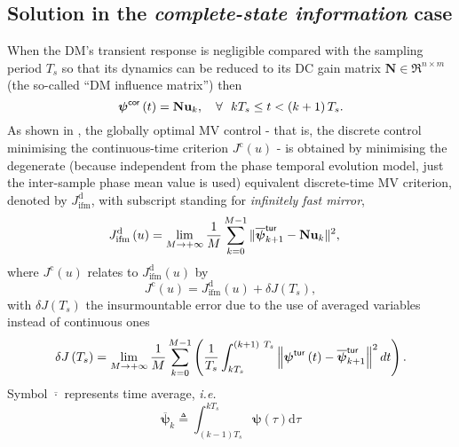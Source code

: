 \documentclass[a4paper,12pt]{article}
\newcommand{\0}{\mathsf{0}} %
\newcommand{\N}{\mathbf{N}} %
\newcommand{\tur}{\mathsf{\tiny{tur}}}
\newcommand{\dint}{\mathrm{d}} %
\newcommand{\cor}{\mathsf{\tiny{cor}}}
\newcommand{\phivec}{{\boldsymbol{\psi}}}
\newcommand{\uvec}{{\mathbf{u}}}
\begin{document}
        \subsection{Solution in the \emph{complete-state information} case}
        When the DM's transient response is negligible compared with the sampling
        period ${T_s}$ so that its dynamics can be reduced to its DC gain
        matrix $\N \in \Re^{n\times m}$
        (the so-called ``DM influence matrix'') then 
        \begin{equation}\label{eq:phicorr_from_u}
          \phivec ^{\cor}\left( t\right)
          =\N \uvec_{k},~ ~ ~  \forall~~ k{T_s}\leq t<\left( k+1\right)
          {T_s} .
        \end{equation}
        As shown in \cite{ kulcsar06},  the globally optimal MV
        control - that is, the discrete control 
        minimising the continuous-time criterion $J^\mathrm{c}(u)$ - is obtained by
        minimising the degenerate (because independent from the
        phase temporal evolution model, just the inter-sample phase
        mean value is used) equivalent discrete-time MV
        criterion\cite{leroux04, petit04}, denoted by
        $J_{\text{ifm}}^{\mathrm{d}}$, with subscript standing for \emph{infinitely
        fast mirror}, 
        \begin{align}
          J_\text{ifm}^{\mathrm{d}}\left(u\right)   &
          =\lim_{M\rightarrow+\infty}\frac{1}{M}\sum_{k=0}^{M-1}\Vert\overline{\phivec}_{k+1}^{\tur}
          - \N \uvec_k \Vert^2 ,
          \label{eq:Disc_criterion}
	\end{align}
        where $J^\mathrm{c}(u)$ relates to $J^\mathrm{d}_\text{ifm}(u)$ by
        \begin{equation}\label{eq:insurmontableerror}
        J^\mathrm{c}(u) = J^\mathrm{d}_\text{ifm}(u) + \delta J({T_s}) ,
	\end{equation}
        with $\delta J({T_s})$ the insurmountable
        error due to the use of averaged variables
        instead of continuous ones~\cite{petit06}
        \begin{equation}\label{eq:unsurmountable_error}
          \delta J\left(   T_s\right)  =\lim_{M\rightarrow+\infty}\frac{1}{M}%
          \sum_{k=0}^{M-1}\left(  \frac{1}{T_s}\int_{k T_s}^{\left(
                k+1\right)  \ T_s}\left\Vert \phivec^{\tur}\left( 
                t\right) - \overline{\phivec}_{k+1}^{\tur}
            \right\Vert ^{2}dt\right).
        \end{equation}
  Symbol $\overline{\cdot}$ represents
time average, \textit{i.e.}
\begin{equation}\label{eq:av_meas}
 \overline{\boldsymbol\phivec}_k \triangleq \int_{(k-1)T_s}^{kT_s} \boldsymbol\phivec(\tau)\dint \tau
\end{equation}
\end{document}
